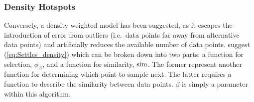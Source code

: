






\subsubsection{Density Hotspots}
\label{sec:litRevDH}
Conversely, a density weighted model has been suggested, as it escapes the introduction of error from outliers (i.e.\ data points far away from alternative data points) and artificially reduces the available number of data points. \textcite{Set08} suggest (\ref{eq:Settles_density}) which can be broken down into two parts: a function for selection, $\phi_A$, and a function for similarity, $\operatorname*{sim}$. The former represent another function for determining which point to sample next. The latter requires a function to describe the similarity between data points. $\beta$ is simply a parameter within this algorithm.

